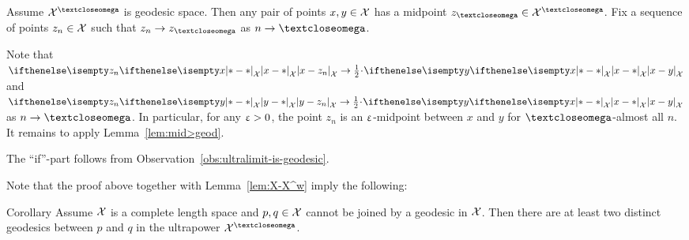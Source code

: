 Assume $\spc{X}^\o$ is geodesic space.
Then any pair of points $x,y\in \spc{X}$ has a midpoint $z_\o\in\spc{X}^\o$.
Fix a sequence of points $z_n\in  \spc{X}$ such that $z_n\to z_\o$ as $n\to \o$.

Note that 
$\dist{x}{z_n}{\spc{X}}\to \tfrac12\cdot \dist{x}{y}{\spc{X}}$
and 
$\dist{y}{z_n}{\spc{X}}\to \tfrac12\cdot \dist{x}{y}{\spc{X}}$
as 
$n\to\o$.
In particular, for any $\upvarepsilon>0$, the point $z_n$ is an $\upvarepsilon$-midpoint between $x$ and $y$ for $\o$-almost all $n$.
It remains to apply Lemma~\ref{lem:mid>geod}.

The ``if''-part follows from Observation~\ref{obs:ultralimit-is-geodesic}.
\qeds

Note that the proof above together with Lemma~\ref{lem:X-X^w} imply the following:

\begin{thm}{Corollary}\label{cor:two-geodesics-in-ultrapower}
Assume $\mathcal{X}$ is a complete length space 
and $p,q\in\spc{X}$ cannot be joined by a geodesic in $\mathcal{X}$.  
Then there are at least two distinct geodesics between $p$ and $q$ 
in the ultrapower $\spc{X}^\o$.
\end{thm}

